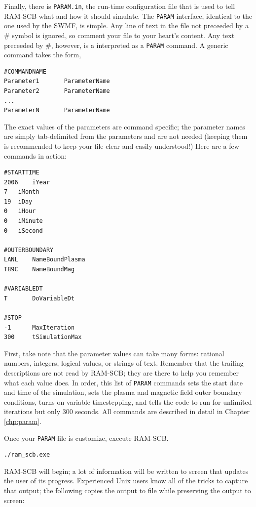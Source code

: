 Finally, there is {\tt PARAM.in}, the run-time configuration file that is used
to tell RAM-SCB what and how it should simulate.  The {\tt PARAM} interface,
identical to the one used by the SWMF, is simple.  Any line of text in the
file not preceeded by a \# symbol is ignored, so comment your file to your
heart's content.    Any text preceeded by \#, however, is a interpreted as
a {\tt PARAM} command.  A generic command takes the form,

\begin{verbatim}
#COMMANDNAME
Parameter1       ParameterName
Parameter2       ParameterName
...
ParameterN       ParameterName
\end{verbatim}

The exact values of the parameters are command specific; the parameter names
are simply tab-delimited from the parameters and are not needed (keeping
them is recommended to keep your file clear and easily understood!)  Here
are a few commands in action:

\begin{verbatim}
#STARTTIME 
2006	iYear 
7	iMonth 
19	iDay 
0	iHour 
0	iMinute 
0	iSecond

#OUTERBOUNDARY 
LANL	NameBoundPlasma 
T89C	NameBoundMag

#VARIABLEDT
T       DoVariableDt

#STOP
-1      MaxIteration
300     tSimulationMax
\end{verbatim}

First, take note that the parameter values can take many forms: rational 
numbers, integers, logical values, or strings of text.  Remember that the
trailing descriptions are not read by RAM-SCB; they are there to help you
remember what each value does.  In order, this list of {\tt PARAM} commands sets
the start date and time of the simulation, sets the plasma and magnetic field
outer boundary conditions, turns on variable timestepping, and tells the
code to run for unlimited iterations but only 300 seconds.  All commands are
described in detail in Chapter \ref{chp:param}.

Once your {\tt PARAM} file is customize, execute RAM-SCB.

\begin{verbatim}
./ram_scb.exe
\end{verbatim}

RAM-SCB will begin; a lot of information will be written to screen that updates
the user of its progress.  Experienced Unix users know all of the tricks to
capture that output; the following copies the output to file while preserving
the output to screen:

